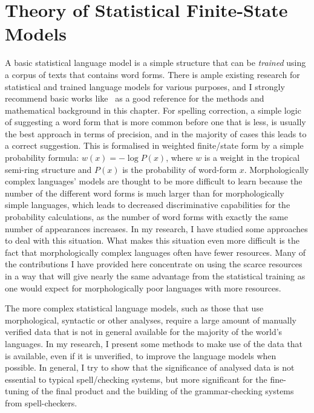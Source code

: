 \documentclass[officiallayout,final]{unihelcompling}
\begin{document}
\section{Theory of Statistical Finite-State Models}
\label{sec:statistical}

A basic statistical language model is a simple structure that can be
\emph{trained} using a corpus of texts that contains word forms. There is ample
existing research for statistical and trained language models for various
purposes, and I strongly recommend basic works
like~\citet{manning1999foundations} as a good reference for the methods and
mathematical background in this chapter.  For spelling correction, a simple
logic of suggesting a word form that is more common before one that is less, is
usually the best approach in terms of precision, and in the majority of cases
this leads to a correct suggestion. This is formalised in weighted
finite\-/state form by a simple probability formula: $w(x) = -\log P(x)$, where
$w$ is a weight in the tropical semi-ring structure and $P(x)$ is the probability
of word-form $x$.  Morphologically complex languages' models are thought to be
more difficult to learn because the number of the different word forms is much
larger than for morphologically simple languages, which leads to decreased
discriminative capabilities for the probability calculations, as the number of
word forms with exactly the same number of appearances increases. In my
research, I have studied some approaches to deal with this situation.  What
makes this situation even more difficult is the fact that morphologically
complex languages often have fewer resources.  Many of the contributions I have
provided here concentrate on using the scarce resources in a way that will give
nearly the same advantage from the statistical training as one would expect for
morphologically poor languages with more resources.

The more complex statistical language models, such as those that use
morphological, syntactic or other analyses, require a large amount of manually
verified data that is not in general available for the majority of the world's
languages. In my research, I present some methods to make use of the data that
is available, even if it is unverified, to improve the language models when
possible. In general, I try to show that the significance of analysed data is
not essential to typical spell\-/checking systems, but more significant for the
fine-tuning of the final product and the building of the grammar-checking
systems from spell-checkers.
\end{document}
